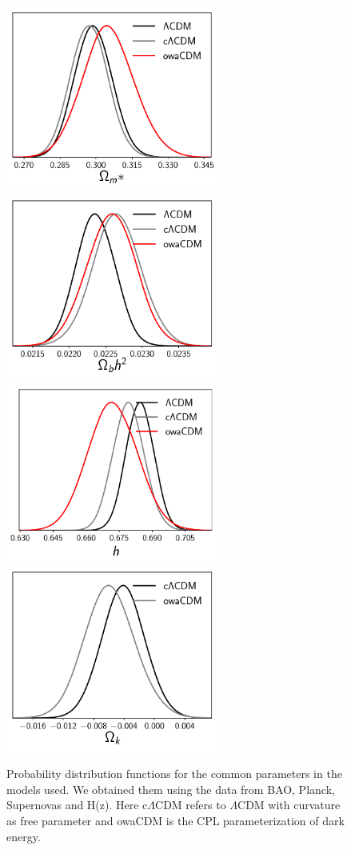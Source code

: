 \documentclass[onecolumn,           %
               showpacs,            %
               preprintnumbers,     %
               aps,                 %
               letterpaper,             %
               superscriptaddress,      %
               nofootinbib,         %
               tightenlines,        %
               floats,floatfix      %
               ,usenatbib,
               ]{revtex4-1}
\begin{document}
\begin{figure}[htp]
	\centering
	\includegraphics[width=7cm]{FiguresCosmo/Om_best_fit.pdf}	
	\includegraphics[width=7cm]{FiguresCosmo/Obh2_best_fit.pdf}
	\includegraphics[width=7cm]{FiguresCosmo/h_best_fit.pdf}
	\includegraphics[width=7cm]{FiguresCosmo/Ok_best_fit.pdf}
	\caption{Probability distribution functions for the common parameters in the models used. We obtained them using the data from BAO, Planck, Supernovas and H(z). Here c$\Lambda$CDM refers to $\Lambda$CDM with curvature as free parameter and owaCDM is the CPL parameterization of dark energy.}
	\label{bestfit}
\end{figure}
\end{document}
